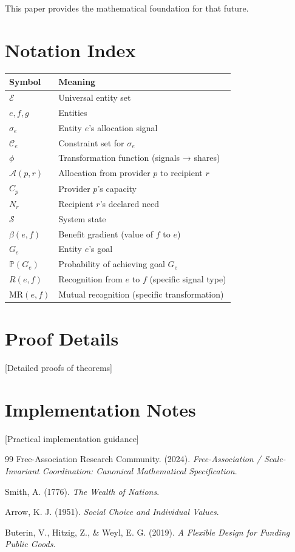 \documentclass[11pt,a4paper]{article}
\theoremstyle{definition}
\theoremstyle{remark}
\newcommand{\E}{\mathcal{E}}
\begin{document}
This paper provides the mathematical foundation for that future.

\appendix

\section{Notation Index}

\begin{tabular}{ll}
\toprule
\textbf{Symbol} & \textbf{Meaning} \\
\midrule
$\E$ & Universal entity set \\
$e, f, g$ & Entities \\
$\sigma_e$ & Entity $e$'s allocation signal \\
$\mathcal{C}_e$ & Constraint set for $\sigma_e$ \\
$\phi$ & Transformation function (signals → shares) \\
$\mathcal{A}(p,r)$ & Allocation from provider $p$ to recipient $r$ \\
$C_p$ & Provider $p$'s capacity \\
$N_r$ & Recipient $r$'s declared need \\
$\mathcal{S}$ & System state \\
$\beta(e,f)$ & Benefit gradient (value of $f$ to $e$) \\
$G_e$ & Entity $e$'s goal \\
$\mathbb{P}(G_e)$ & Probability of achieving goal $G_e$ \\
$R(e,f)$ & Recognition from $e$ to $f$ (specific signal type) \\
$\text{MR}(e,f)$ & Mutual recognition (specific transformation) \\
\bottomrule
\end{tabular}

\section{Proof Details}

[Detailed proofs of theorems]

\section{Implementation Notes}

[Practical implementation guidance]

\begin{thebibliography}{99}
Free-Association Research Community. (2024). \textit{Free-Association / Scale-Invariant Coordination: Canonical Mathematical Specification}.

Smith, A. (1776). \textit{The Wealth of Nations}.

Arrow, K. J. (1951). \textit{Social Choice and Individual Values}.

Buterin, V., Hitzig, Z., \& Weyl, E. G. (2019). \textit{A Flexible Design for Funding Public Goods}.

\end{thebibliography}
\end{document}

